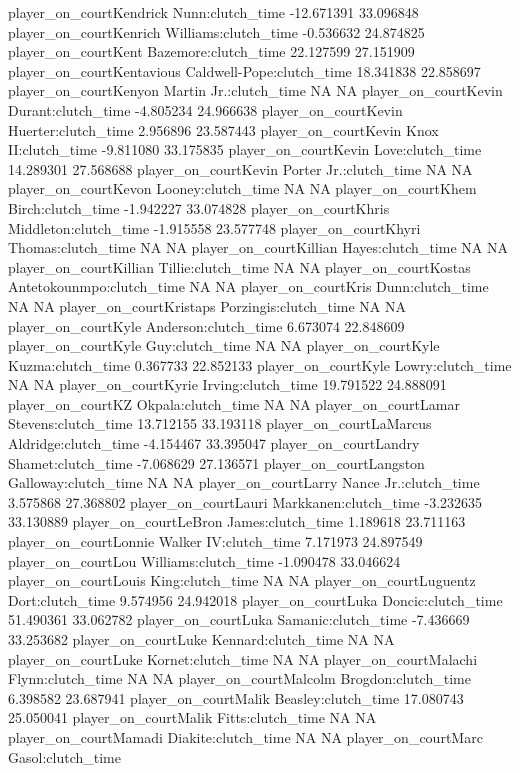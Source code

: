\documentclass[
  landscape]{article}
\begin{document}
player\_on\_courtKendrick Nunn:clutch\_time -12.671391 33.096848
player\_on\_courtKenrich Williams:clutch\_time -0.536632 24.874825
player\_on\_courtKent Bazemore:clutch\_time 22.127599 27.151909
player\_on\_courtKentavious Caldwell-Pope:clutch\_time 18.341838
22.858697 player\_on\_courtKenyon Martin Jr.:clutch\_time NA NA
player\_on\_courtKevin Durant:clutch\_time -4.805234 24.966638
player\_on\_courtKevin Huerter:clutch\_time 2.956896 23.587443
player\_on\_courtKevin Knox II:clutch\_time -9.811080 33.175835
player\_on\_courtKevin Love:clutch\_time 14.289301 27.568688
player\_on\_courtKevin Porter Jr.:clutch\_time NA NA
player\_on\_courtKevon Looney:clutch\_time NA NA player\_on\_courtKhem
Birch:clutch\_time -1.942227 33.074828 player\_on\_courtKhris
Middleton:clutch\_time -1.915558 23.577748 player\_on\_courtKhyri
Thomas:clutch\_time NA NA player\_on\_courtKillian Hayes:clutch\_time NA
NA player\_on\_courtKillian Tillie:clutch\_time NA NA
player\_on\_courtKostas Antetokounmpo:clutch\_time NA NA
player\_on\_courtKris Dunn:clutch\_time NA NA player\_on\_courtKristaps
Porzingis:clutch\_time NA NA player\_on\_courtKyle Anderson:clutch\_time
6.673074 22.848609 player\_on\_courtKyle Guy:clutch\_time NA NA
player\_on\_courtKyle Kuzma:clutch\_time 0.367733 22.852133
player\_on\_courtKyle Lowry:clutch\_time NA NA player\_on\_courtKyrie
Irving:clutch\_time 19.791522 24.888091 player\_on\_courtKZ
Okpala:clutch\_time NA NA player\_on\_courtLamar Stevens:clutch\_time
13.712155 33.193118 player\_on\_courtLaMarcus Aldridge:clutch\_time
-4.154467 33.395047 player\_on\_courtLandry Shamet:clutch\_time
-7.068629 27.136571 player\_on\_courtLangston Galloway:clutch\_time NA
NA player\_on\_courtLarry Nance Jr.:clutch\_time 3.575868 27.368802
player\_on\_courtLauri Markkanen:clutch\_time -3.232635 33.130889
player\_on\_courtLeBron James:clutch\_time 1.189618 23.711163
player\_on\_courtLonnie Walker IV:clutch\_time 7.171973 24.897549
player\_on\_courtLou Williams:clutch\_time -1.090478 33.046624
player\_on\_courtLouis King:clutch\_time NA NA player\_on\_courtLuguentz
Dort:clutch\_time 9.574956 24.942018 player\_on\_courtLuka
Doncic:clutch\_time 51.490361 33.062782 player\_on\_courtLuka
Samanic:clutch\_time -7.436669 33.253682 player\_on\_courtLuke
Kennard:clutch\_time NA NA player\_on\_courtLuke Kornet:clutch\_time NA
NA player\_on\_courtMalachi Flynn:clutch\_time NA NA
player\_on\_courtMalcolm Brogdon:clutch\_time 6.398582 23.687941
player\_on\_courtMalik Beasley:clutch\_time 17.080743 25.050041
player\_on\_courtMalik Fitts:clutch\_time NA NA player\_on\_courtMamadi
Diakite:clutch\_time NA NA player\_on\_courtMarc Gasol:clutch\_time
\end{document}
